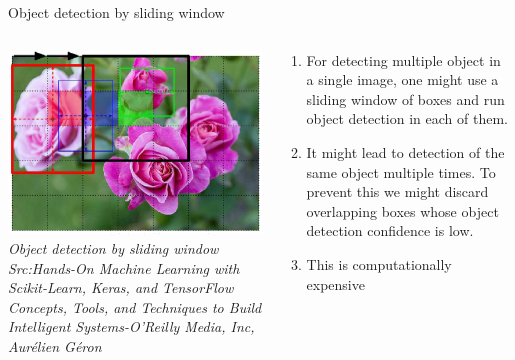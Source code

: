 \begin{frame}{Object detection by sliding window}
	\begin{columns}[T]
        \begin{column}{0.4\textwidth}
        	\includegraphics[width=\textwidth]{images/object detecton sliding CNN.png}
			\tiny{\textit{Object detection by sliding window\\ Src:Hands-On Machine Learning with Scikit-Learn, Keras, and TensorFlow  Concepts, Tools, and Techniques to Build Intelligent Systems-O'Reilly Media, Inc, Aurélien Géron }}
        \end{column}
		\begin{column}{0.6\textwidth}
			\begin{enumerate}[$\bullet$]
				\item For detecting multiple object in a single image, one might use a sliding window of boxes and run object detection in each of them.
				\item It might lead to detection of the same object multiple times. To prevent this we might discard overlapping boxes whose object detection confidence is low.\pause
				\item This is computationally expensive
			\end{enumerate}
		\end{column} 
    \end{columns}
\end{frame}


